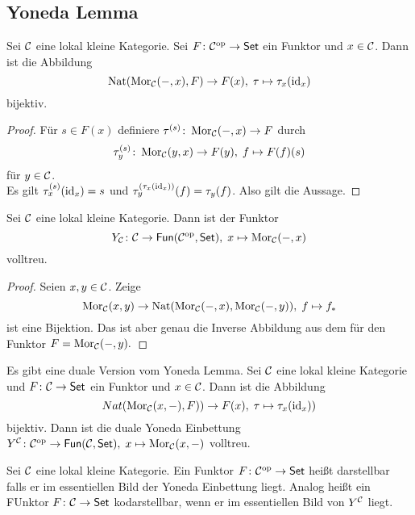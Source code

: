 \subsection{Yoneda Lemma}
\begin{Satz}\label{Lem:Yoneda}
    Sei \(\mathcal{C}\) eine lokal kleine Kategorie. Sei \(F\colon \mathcal{C}^{\mathrm{op}}\to\mathsf{Set}\) ein Funktor und \(x\in\mathcal{C}\). Dann ist die Abbildung 
    \[\operatorname{Nat}(\operatorname{Mor}_{\mathcal{C}}(-,x),F)\to F(x),\; \tau\mapsto \tau_x(\mathrm{id}_x)\] bijektiv.
\end{Satz}
\begin{proof}
    Für \(s\in F(x)\) definiere \(\tau^{(s)}\colon\operatorname{Mor}_{\mathcal{C}}(-,x)\to F\) durch \[\tau_y^{(s)}\colon \operatorname{Mor}_{\mathcal{C}}(y,x)\to F(y),\; f\mapsto F(f)(s)\] für \(y\in \mathcal{C}\).\\
    Es gilt \(\tau_x^{(s)}(\mathrm{id}_x)=s\) und \(\tau_y^{(\tau_x(\mathrm{id}_x))}(f)=\tau_y(f)\).
    Also gilt die Aussage.
\end{proof}
\begin{Kor}
    Sei \(\mathcal{C}\) eine lokal kleine Kategorie. Dann ist der Funktor \[Y_{\mathcal{C}}\colon\mathcal{C}\to\mathsf{Fun}(\mathcal{C}^{\mathrm{op}},\mathsf{Set}),\; x\mapsto \operatorname{Mor}_{\mathcal{C}}(-,x)\] volltreu.
\end{Kor}
\begin{proof}
    Seien \(x,y\in\mathcal{C}\). Zeige 
    \[\operatorname{Mor}_{\mathcal{C}}(x,y)\to\operatorname{Nat}(\operatorname{Mor}_{\mathcal{C}}(-,x),\operatorname{Mor}_{\mathcal{C}}(-,y)),\; f\mapsto f_*\] ist eine Bijektion. Das ist aber genau die Inverse Abbildung aus dem  für den Funktor \(F=\operatorname{Mor}_{\mathcal{C}}(-,y).\)
\end{proof}
\begin{Bem}
    Es gibt eine duale Version vom Yoneda Lemma. Sei \(\mathcal{C}\) eine lokal kleine Kategorie und \(F\colon\mathcal{C}\to\mathsf{Set}\) ein Funktor und \(x\in\mathcal{C}\). Dann ist die Abbildung 
    \[Nat(\operatorname{Mor}_{\mathcal{C}}(x,-),F))\to F(x),\; \tau\mapsto \tau_x(\mathrm{id}_x))\] bijektiv. Dann ist die duale Yoneda Einbettung \(Y^{\mathcal{C}}\colon\mathcal{C}^{\mathrm{op}}\to\mathsf{Fun}(\mathcal{C},\mathsf{Set}),\; x\mapsto \operatorname{Mor}_{\mathcal{C}}(x,-)\) volltreu.
\end{Bem}
\begin{Def}
    Sei \(\mathcal{C}\) eine lokal kleine Kategorie. Ein Funktor \(F\colon\mathcal{C}^{\mathrm{op}}\to \mathsf{Set}\) heißt darstellbar falls er im essentiellen Bild der Yoneda Einbettung liegt.  Analog heißt ein FUnktor \(F\colon\mathcal{C}\to\mathsf{Set}\)  kodarstellbar, wenn er im essentiellen Bild von \(Y^{\mathcal{C}}\) liegt.
\end{Def}
